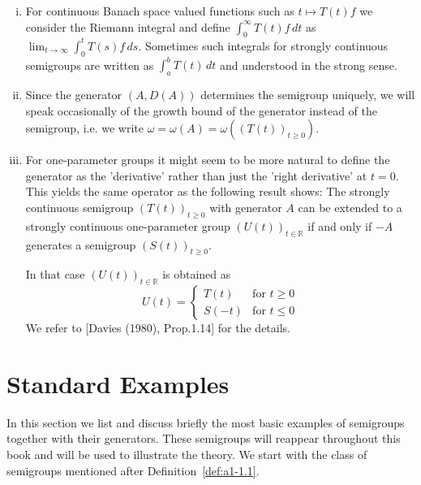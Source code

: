 \begin{remarks}\label{rem:a1-1.12}

\begin{enumerate}[(i)]

\item For continuous Banach space valued functions such as $t \mapsto T(t)f$ we consider the Riemann integral and define $\int_{0}^{\infty}T(t)f \, dt$ as $\lim_{t \to \infty}\int_{0}^{t}T(s)f \, ds$.
Sometimes such integrals for strongly continuous semigroups are written as $\int_{a}^{b}T(t) \, dt$ and understood in the strong sense.

\item Since the generator $(A,D(A))$ determines the semigroup uniquely, we will speak occasionally of the growth bound of the generator instead of the semigroup, i.e. we write $\omega = \omega(A) = \omega((T(t))_{t \geq 0})$.

\item For one-parameter groups it might seem to be more natural to define the generator as the 'derivative' rather than just the 'right derivative' at $t = 0$.
This yields the same operator as the following result shows:
The strongly continuous semigroup $(T(t))_{t \geq 0}$ with generator $A$ can be extended to a strongly continuous one-parameter group $(U(t))_{t \in \mathbb{R}}$ if and only if $-A$ generates a semigroup $(S(t))_{t \geq 0}$.

In that case $(U(t))_{t \in \mathbb{R}}$ is obtained as
\[
    U(t) = \begin{cases}
        T(t) & \text{for } t \geq 0 \\
        S(-t) & \text{for } t \leq 0
    \end{cases}
\]
We refer to [Davies (1980), Prop.1.14] for the details.

\end{enumerate}
\end{remarks}

\newpage

\section{Standard Examples}\label{sec:a1-2}


In this section we list and discuss briefly the most basic examples of semigroups together with their generators.
These semigroups will reappear throughout this book and will be used to illustrate the theory.
We start with the class of semigroups mentioned after Definition~\ref{def:a1-1.1}.

